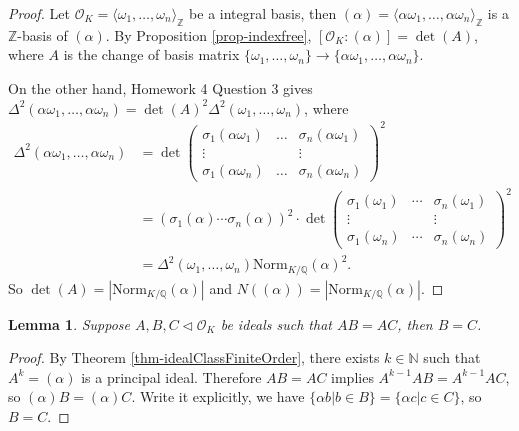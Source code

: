 \documentclass[11pt]{book}
\newtheorem{lemma}[theorem]{Lemma}
\begin{document}
\begin{proof}
    Let $\mathcal{O}_{K}=\langle \omega_{1},\dots,\omega_{n}\rangle_{\mathbb{Z}}$ be a integral basis, then $(\alpha)=\langle \alpha\omega_{1},\dots, \alpha\omega_{n}\rangle_{\mathbb{Z}}$ is a $\mathbb{Z}$-basis of $(\alpha)$. 
    By Proposition \ref{prop-indexfree}, $[\mathcal{O}_{K}:(\alpha)]=\det(A)$, where $A$ is the change of basis matrix $\{\omega_{1},\dots, \omega_{n}\}\to \{\alpha\omega_{1},\dots,\alpha\omega_{n}\}$. 
    
    
    
    On the other hand, Homework 4 Question 3 gives $\Delta^{2}(\alpha\omega_{1},\dots,\alpha\omega_{n})=\det(A)^{2}\Delta^{2}(\omega_{1},\dots,\omega_{n})$, where
    \[
    \begin{aligned}
        \Delta^{2}(\alpha\omega_{1},\dots,\alpha\omega_{n})&=\det\begin{pmatrix}
            \sigma_{1}(\alpha \omega_{1})&\dots &\sigma_{n}(\alpha\omega_{1})\\
            \vdots&&\vdots\\
            \sigma_{1}(\alpha \omega_{n})&\dots &\sigma_{n}(\alpha\omega_{n})
        \end{pmatrix}^{2}\\
        &=(\sigma_{1}(\alpha)\cdots \sigma_{n}(\alpha))^{2}\cdot \det \begin{pmatrix}
            \sigma_{1}(\omega_{1})&\cdots&\sigma_{n}(\omega_{1})\\
            \vdots && \vdots\\
            \sigma_{1}(\omega_{n})&\cdots&\sigma_{n}(\omega_{n})
        \end{pmatrix}^{2}\\
        &=\Delta^{2}(\omega_{1},\dots,\omega_{n})\mathrm{Norm}_{K /\mathbb{Q}}(\alpha)^{2}. 
    \end{aligned}
    \]
    So $\det(A)=\left| \mathrm{Norm}_{K /\mathbb{Q}}(\alpha) \right| $ and $N((\alpha))=|\mathrm{Norm}_{K /\mathbb{Q}}(\alpha)|$. 
\end{proof}

\begin{lemma}
    Suppose $A,B,C\lhd \mathcal{O}_{K}$ be ideals such that $AB=AC$, then $B=C$. 
\end{lemma}

\begin{proof}
    By Theorem \ref{thm-idealClassFiniteOrder}, there exists $k\in \mathbb{N}$ such that $A^{k}=(\alpha)$ is a principal ideal. Therefore $AB=AC$ implies $A^{k-1}AB=A^{k-1}AC$, so $(\alpha)B=(\alpha)C$. Write it explicitly, we have $\{\alpha b|b\in B\}=\{\alpha c|c\in C\}$, so $B=C$.  
\end{proof}
\end{document}
